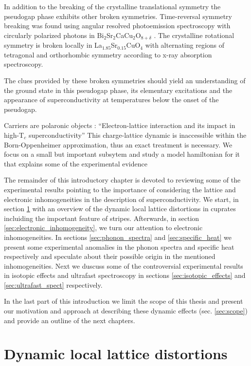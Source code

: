 In addition to the breaking of the crystalline translational symmetry the pseudogap phase exhibits other broken symmetries. 
Time-reversal symmetry breaking was found using angular resolved photoemission spectroscopy with circularly polarized photons in Bi$_{2}$Sr$_{2}$CaCu$_{2}$O$_{8+\delta}$ \cite{Kaminski2002}. 
The crystalline rotational symmetry is broken locally in La$_{1.85}$Sr$_{0.15}$CuO$_{4}$ with alternating regions of tetragonal and orthorhombic symmetry \cite{Bianconi1996} according to x-ray absorption spectroscopy. 

The clues provided by these broken symmetries should yield an understanding of the ground state in this pseudogap phase, its elementary excitations and the appearance of superconductivity at temperatures below the onset of the pseudogap. 

Carriers are polaronic objects \cite{Zhao1997}
\cite{Kresin2009}: ``Electron-lattice interaction and its impact in high-T$_c$ superconductivity'' 
This charge-lattice dynamic is inaccessible within the Born-Oppenheimer approximation, thus an exact treatment is necessary.
We focus on a small but important subsytem and study a model hamiltonian for it that explains some of the experimental evidence

The remainder of this introductory chapter is devoted to reviewing some of the experimental results pointing to the importance of considering the lattice and electronic inhomogeneities in the description of superconductivity. 
We start, in section \ref{sec:dynamicDistortions} with an overview of the dynamic local lattice distortions in cuprates incluiding the important feature of stripes. 
Afterwards, in section \ref{sec:electronic_inhomogeneity}, we turn our attention to electronic inhomogeneities. 
In sections \ref{sec:phonon_spectra} and \ref{sec:specific_heat} we present some experimental anomalies in the phonon spectra and specific heat respectively and speculate about their possible origin in the mentioned inhomogeneities. 
Next we duscuss some of the controversial experimental results in isotopic effects and ultrafast spectroscopy in sections \ref{sec:isotopic_effects} and \ref{sec:ultrafast_spect} respectively.

In the last part of this introduction we limit the scope of this thesis and present our motivation and approach at describing these dynamic effects (sec. \ref{sec:scope}) and provide an outline of the next chapters.


\section{Dynamic local lattice distortions}
\label{sec:dynamicDistortions}

